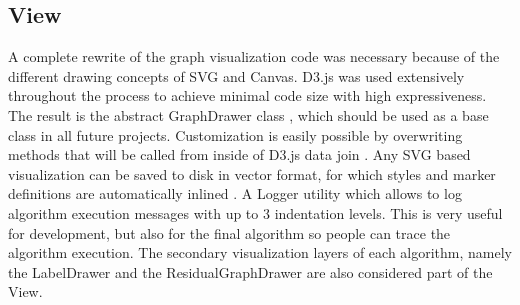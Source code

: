 \subsection{View}\label{sec:view}
A complete rewrite of the graph visualization code was necessary because of the different drawing concepts of SVG and Canvas. D3.js was used extensively throughout the process to achieve minimal code size with high expressiveness. The result is the abstract GraphDrawer class , which should be used as a base class in all future projects. Customization is easily possible by overwriting methods that will be called from inside of D3.js data join . Any SVG based visualization can be saved to disk in vector format, for which styles and marker definitions are automatically inlined . A Logger utility which allows to log algorithm execution messages with up to 3 indentation levels. This is very useful for development, but also for the final algorithm so people can trace the algorithm execution. The secondary visualization layers of each algorithm, namely the LabelDrawer and the ResidualGraphDrawer are also considered part of the View. 



